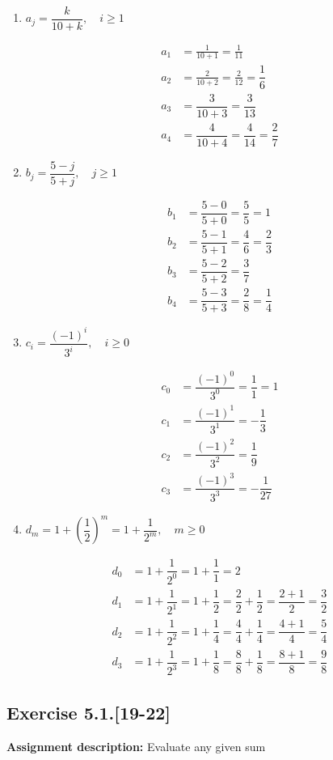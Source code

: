 \documentclass{report}
\newcommand{\mAlign}[1]{\begin{align*}#1\end{align*}}
\newcommand{\assignmentDescription}{\textbf{Assignment description: }}
\newcommand{\Exercise}[1]{\subsection{Exercise #1}}
\newcommand{\parenthesis}[1]{\left( #1 \right)}
\begin{document}
	\begin{enumerate}
		\item $ a_j = \dfrac{k}{10+k}, \quad i \geq 1$
		
		\mAlign{
			a_1 &= \frac{1}{10+1} = \frac{1}{11} \\
			a_2 &= \frac{2}{10+2} = \frac{2}{12} = \dfrac{1}{6}\\
			a_3 &= \dfrac{3}{10+3} = \dfrac{3}{13} \\
			a_4 &= \dfrac{4}{10+4} = \dfrac{4}{14} = \dfrac{2}{7}
		}
		
		\item $ b_j = \dfrac{5-j}{5+j}, \quad j \geq 1$
		
		\mAlign{b_1 &= \dfrac{5-0}{5+0} = \dfrac{5}{5} = 1\\
					 b_2 &= \dfrac{5-1}{5+1} = \dfrac{4}{6} = \dfrac{2}{3} \\
				 	 b_3 &= \dfrac{5-2}{5+2} = \dfrac{3}{7} \\
			 	 	 b_4 &= \dfrac{5-3}{5+3} = \dfrac{2}{8} = \dfrac{1}{4}}
		
		\item $c_i = \dfrac{(-1)^i}{3^i}, \quad i \geq 0$
		
		\mAlign{c_0 &= \dfrac{(-1)^0}{3^0} = \dfrac{1}{1} = 1 \\
					 c_1 &= \dfrac{(-1)^1}{3^1} = - \dfrac{1}{3} \\
				 	 c_2 &= \dfrac{(-1)^2}{3^2} = \dfrac{1}{9} \\
			 	     c_3 &= \dfrac{(-1)^3}{3^3} = -\dfrac{1}{27}}
		
		\item $d_m = 1 + \parenthesis{\dfrac{1}{2}}^m = 1 + \dfrac{1}{2^m}, \quad m \geq 0$
		
		\mAlign{ d_0 &= 1 + \dfrac{1}{2^0} = 1 + \dfrac{1}{1} = 2 \\
					 d_1 &= 1+ \dfrac{1}{2^1} = 1+ \dfrac{1}{2} = \dfrac{2}{2} + \dfrac{1}{2} = \dfrac{2+1}{2} = \dfrac{3}{2} \\
				 	 d_2 &= 1 + \dfrac{1}{2^2} = 1 + \dfrac{1}{4} = \dfrac{4}{4} + \dfrac{1}{4} = \dfrac{4+1}{4} = \dfrac{5}{4} \\
			 		 d_3 &= 1 + \dfrac{1}{2^3} = 1+\dfrac{1}{8} = \dfrac{8}{8} + \dfrac{1}{8} = \dfrac{8+1}{8}=\dfrac{9}{8}}
		
	\end{enumerate}
	\Exercise{5.1.[19-22]}
	
	\assignmentDescription
	Evaluate any given sum
		
\end{document}
